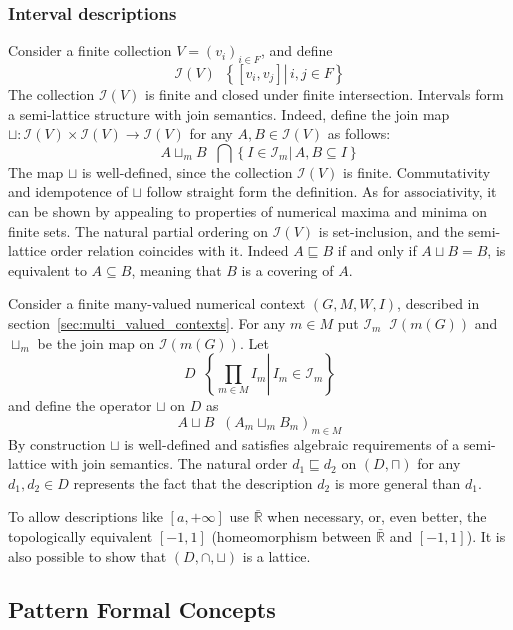 \documentclass[a4paper]{article}
\newcommand{\obj}[1]{{\left\{ #1 \right \}}}
\newcommand{\clo}[1]{{\left [ #1 \right ]}}
\newcommand{\brac}[1]{{\left ( #1 \right )}}
\newcommand{\induc}[1]{{\left . #1 \right \vert}}
\newcommand{\Real}{\mathbb{R}}
\newcommand{\Ical}{\mathcal{I}}
\newcommand{\defn}{\mathop{\overset{\Delta}{=}}\nolimits}
\begin{document}

\subsubsection*{Interval descriptions} %
\label{ssub:interval_descriptions}

Consider a finite collection $V = \brac{v_i}_{i\in F}$, and define \[\Ical(V) \defn \obj{ \induc{ \clo{v_i, v_j} }\, i,j\in F}\] The collection $\Ical(V)$ is finite and closed under finite intersection. Intervals form a semi-lattice structure with join semantics. Indeed, define the join map $\sqcup:\Ical(V)\times\Ical(V)\to\Ical(V)$ for any $A,B\in\Ical(V)$ as follows: \[A\sqcup_m B \defn \bigcap\obj{ \induc{ I\in \mathcal{I}_m }\,A,B\subseteq I }\] The map $\sqcup$ is well-defined, since the collection $\Ical(V)$ is finite. Commutativity and idempotence of $\sqcup$ follow straight form the definition. As for associativity, it can be shown by appealing to properties of numerical maxima and minima on finite sets. The natural partial ordering on $\Ical(V)$ is set-inclusion, and the semi-lattice order relation coincides with it. Indeed $A\sqsubseteq B$ if and only if $A\sqcup B = B$, is equivalent to $A\subseteq B$, meaning that $B$ is a covering of $A$.

Consider a finite many-valued numerical context $\brac{G,M,W,I}$, described in section~\ref{sec:multi_valued_contexts}. For any $m\in M$ put $\Ical_m \defn \Ical\brac{m(G)}$ and $\sqcup_m$ be the join map on $\Ical\brac{m(G)}$. Let \[D\defn \obj{\induc{\prod_{m\in M} I_m}\, I_m\in \mathcal{I}_m}\] and define the operator $\sqcup$ on $D$ as \[ A\sqcup B \defn \brac{A_m\sqcup_m B_m}_{m\in M}\] By construction $\sqcup$ is well-defined and satisfies algebraic requirements of a semi-lattice with join semantics. The natural order $d_1\sqsubseteq d_2$ on $(D,\sqcap)$ for any $d_1, d_2\in D$ represents the fact that the description $d_2$ is more general than $d_1$.

To allow descriptions like $\clo{a, +\infty}$ use $\bar{\Real}$ when necessary, or, even better, the topologically equivalent $\clo{-1,1}$ (homeomorphism between $\bar{\Real}$ and $\clo{-1,1}$). It is also possible to show that $(D,\cap,\sqcup)$ is a lattice.


\subsection{Pattern Formal Concepts} %
\label{sub:pattern_formal_concepts}
\end{document}

